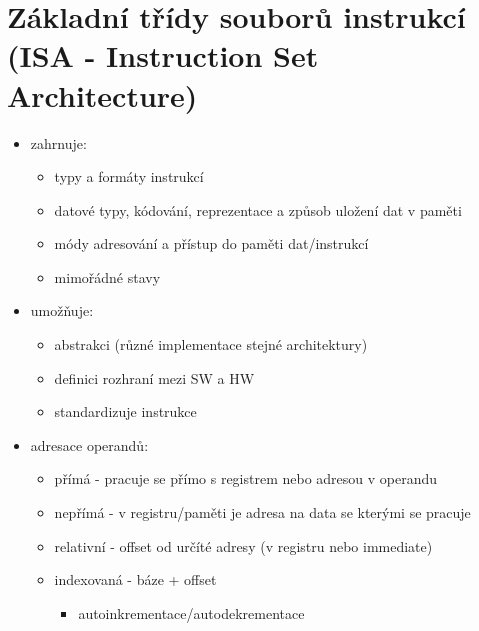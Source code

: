 \documentclass{szzclass}
\providecommand{\tightlist}{%
  \setlength{\itemsep}{0pt}\setlength{\parskip}{0pt}}
\begin{document}
\hypertarget{zuxe1kladnuxed-tux159uxeddy-souborux16f-instrukcuxed-isa---instruction-set-architecture}{%
\section{Základní třídy souborů instrukcí (ISA - Instruction Set
Architecture)}\label{zuxe1kladnuxed-tux159uxeddy-souborux16f-instrukcuxed-isa---instruction-set-architecture}}

\begin{itemize}
\tightlist
\item
  zahrnuje:

  \begin{itemize}
  \tightlist
  \item
    typy a formáty instrukcí
  \item
    datové typy, kódování, reprezentace a způsob uložení dat v paměti
  \item
    módy adresování a přístup do paměti dat/instrukcí
  \item
    mimořádné stavy
  \end{itemize}
\item
  umožňuje:

  \begin{itemize}
  \tightlist
  \item
    abstrakci (různé implementace stejné architektury)
  \item
    definici rozhraní mezi SW a HW
  \item
    standardizuje instrukce
  \end{itemize}
\item
  adresace operandů:

  \begin{itemize}
  \tightlist
  \item
    přímá - pracuje se přímo s registrem nebo adresou v operandu
  \item
    nepřímá - v registru/paměti je adresa na data se kterými se pracuje
  \item
    relativní - offset od určíté adresy (v registru nebo immediate)
  \item
    indexovaná - báze + offset

    \begin{itemize}
    \tightlist
    \item
      autoinkrementace/autodekrementace
    \end{itemize}
  \end{itemize}
\end{itemize}
\end{document}

